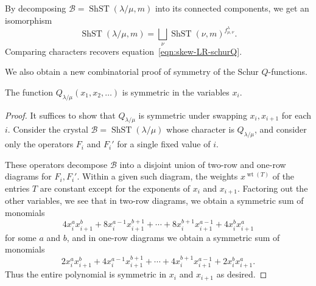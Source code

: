 \documentclass[ALCO,ThmDefs,Unicode,epreuves]{cedram}
\DeclareMathOperator{\ShST}{ShST}
\DeclareMathOperator{\wt}{wt}
\newcommand{\B}{\mathcal{B}}
\begin{document}
\begin{coro}
By decomposing $\B=\ShST(\lambda/\mu,m)$ into its connected components, we get an isomorphism
\[
\ShST(\lambda/\mu,m) = \bigsqcup_\nu \ShST(\nu,m)^{f_{\mu,\nu}^\lambda}.
\]
Comparing characters recovers equation~\eqref{eqn:skew-LR-schurQ}.
\end{coro}

We also obtain a new combinatorial proof of symmetry of the Schur $Q$-functions.

\begin{coro} \label{cor:symmetry-schurQ}
The function $Q_{\lambda/\mu}(x_1,x_2,\ldots)$ is symmetric in the variables $x_i$.
\end{coro}

\begin{proof}
It suffices to show that $Q_{\lambda/\mu}$ is symmetric under swapping $x_i,x_{i+1}$ for each $i$. Consider the crystal $\B=\ShST(\lambda/\mu)$ whose character is $Q_{\lambda/\mu}$, and consider only the operators $F_i$ and $F_i'$ for a single fixed value of $i$.

These operators decompose $\B$ into a disjoint union of two-row and one-row diagrams for $F_i,F_i'$. Within a given such diagram, the weights $x^{\wt(T)}$ of the entries $T$ are constant except for the exponents of $x_i$ and $x_{i+1}$. Factoring out the other variables, we see that in two-row diagrams, we obtain a symmetric sum of monomials 
\[
4x_i^a x_{i+1}^b+8x_i^{a-1}x_{i+1}^{b+1}+\cdots+ 8x_i^{b+1}x_{i+1}^{a-1}+4x_i^{b}x_{i+1}^a
\]
 for some $a$ and $b$, and in one-row diagrams we obtain a symmetric sum of monomials 
\[
2x_i^a x_{i+1}^b + 4x_i^{a-1}x_{i+1}^{b+1}+\cdots+ 4x_i^{b+1}x_{i+1}^{a-1}+2x_i^{b}x_{i+1}^a.
\]
Thus the entire polynomial is symmetric in $x_i$ and $x_{i+1}$ as desired.
\end{proof}





\end{document}
